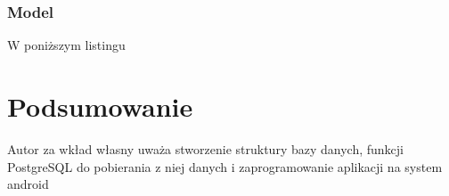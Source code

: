 \documentclass[12pt,twoside]{article}
\begin{document}
\subsubsection{Model}

W poniższym listingu 

\clearpage

\section{Podsumowanie}

Autor za wkład własny uważa stworzenie struktury bazy danych, funkcji PostgreSQL do pobierania z niej danych i 
zaprogramowanie aplikacji na system android 

\clearpage


\begin{thebibliography}{4}
\end{thebibliography}

\clearpage

\makesummary
\end{document}
